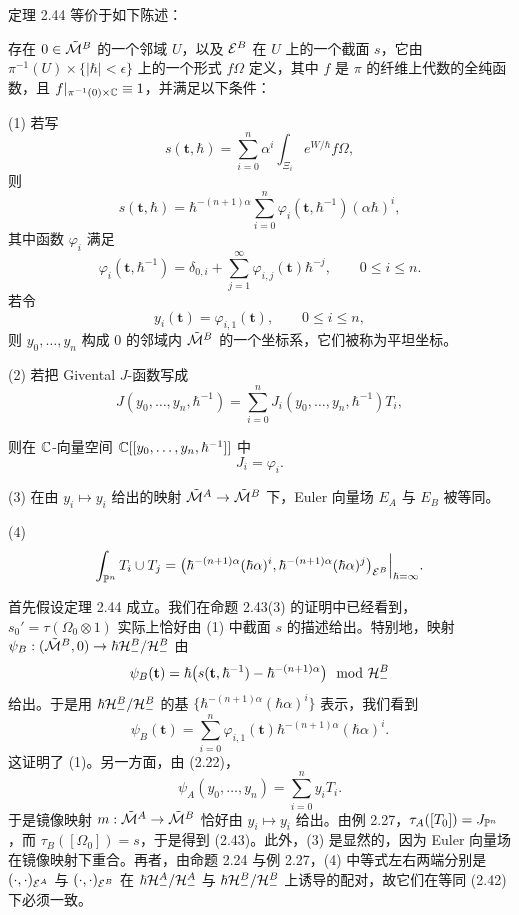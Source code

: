 \begin{proposition}
定理 2.44 等价于如下陈述：

存在 $0\in\tilde{\mathcal{M}}^{B}$ 的一个邻域 $U$，以及 $\mathcal{E}^{B}$ 在 $U$ 上的一个截面 $s$，它由 $\pi^{-1}(U)\times\{|\hbar|<\epsilon\}$ 上的一个形式 $f\Omega$ 定义，其中 $f$ 是 $\pi$ 的纤维上代数的全纯函数，且 $f|_{\pi^{-1}(0)\times\mathbb{C}}\equiv1$，并满足以下条件：

(1) 若写
\[
  s(\mathbf{t},\hbar)=\sum_{i=0}^{n}\alpha^{i}\int_{\Xi_i}e^{W/\hbar}f\Omega,
\]
则
\[
  s(\mathbf{t},\hbar)=\hbar^{-(n+1)\alpha}\sum_{i=0}^{n}
  \varphi_i(\mathbf{t},\hbar^{-1})(\alpha\hbar)^{i},
\]
其中函数 $\varphi_i$ 满足
\[
  \varphi_i(\mathbf{t},\hbar^{-1})=\delta_{0,i}
  +\sum_{j=1}^{\infty}\varphi_{i,j}(\mathbf{t})\hbar^{-j},
  \qquad 0\le i\le n.
\]
若令
\[
  y_i(\mathbf{t})=\varphi_{i,1}(\mathbf{t}),\qquad 0\le i\le n,
\]
则 $y_0,\ldots,y_n$ 构成 $0$ 的邻域内 $\tilde{\mathcal{M}}^{B}$ 的一个坐标系，它们被称为平坦坐标。

(2) 若把 Givental $J$-函数写成
\[
  J(y_0,\ldots,y_n,\hbar^{-1})
  =\sum_{i=0}^{n}J_i(y_0,\ldots,y_n,\hbar^{-1})T_i,
\]

则在 $\mathbb{C}$-向量空间 $\mathbb{C}[[y_0,\ldots,y_n,\hbar^{-1}]]$ 中
\begin{equation}
  J_i=\varphi_i. \tag{2.43}
\end{equation}

(3) 在由 $y_i\mapsto y_i$ 给出的映射 $\tilde{\mathcal{M}}^{A}\to\tilde{\mathcal{M}}^{B}$ 下，Euler 向量场 $E_A$ 与 $E_B$ 被等同。

(4)
\[
  \int_{\mathbb{P}^{n}}T_i\cup T_j
  =\bigl(\hbar^{-(n+1)\alpha}(\hbar\alpha)^{i},
  \hbar^{-(n+1)\alpha}(\hbar\alpha)^{j}\bigr)_{\mathcal{E}^{B}}\Big|_{\hbar=\infty}.
\]
\end{proposition}

首先假设定理 2.44 成立。我们在命题 2.43(3) 的证明中已经看到，$s_0'=\tau(\Omega_0\otimes1)$ 实际上恰好由 (1) 中截面 $s$ 的描述给出。特别地，映射 $\psi_B:(\tilde{\mathcal{M}}^{B},0)\to\hbar\mathcal{H}^{B}_-/\mathcal{H}^{B}_-$ 由
\[
  \psi_B(\mathbf{t})=\hbar\bigl(s(\mathbf{t},\hbar^{-1})-\hbar^{-(n+1)\alpha}\bigr)\mod{\mathcal{H}}^{B}_-
\]
给出。于是用 $\hbar\mathcal{H}^{B}_-/\mathcal{H}^{B}_-$ 的基 $\{\hbar^{-(n+1)\alpha}(\hbar\alpha)^{i}\}$ 表示，我们看到
\[
  \psi_B(\mathbf{t})=\sum_{i=0}^{n}\varphi_{i,1}(\mathbf{t})
  \hbar^{-(n+1)\alpha}(\hbar\alpha)^{i}.
\]
这证明了 (1)。另一方面，由 (2.22)，
\[
  \psi_A(y_0,\ldots,y_n)=\sum_{i=0}^{n}y_iT_i.
\]
于是镜像映射 $m:\tilde{\mathcal{M}}^{A}\to\tilde{\mathcal{M}}^{B}$ 恰好由 $y_i\mapsto y_i$ 给出。由例 2.27，$\tau_A([T_0])=J_{\mathbb{P}^{n}}$，而 $\tau_B([\Omega_0])=s$，于是得到 (2.43)。此外，(3) 是显然的，因为 Euler 向量场在镜像映射下重合。再者，由命题 2.24 与例 2.27，(4) 中等式左右两端分别是 $(\cdot,\cdot)_{\mathcal{E}^{A}}$ 与 $(\cdot,\cdot)_{\mathcal{E}^{B}}$ 在 $\hbar\mathcal{H}^{A}_-/\mathcal{H}^{A}_-$ 与 $\hbar\mathcal{H}^{B}_-/\mathcal{H}^{B}_-$ 上诱导的配对，故它们在等同 (2.42) 下必须一致。


